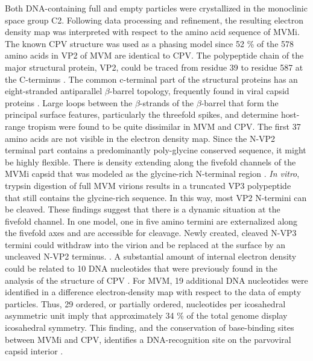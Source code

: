 Both DNA-containing full and empty particles were crystallized in the monoclinic space group C2. Following data processing and refinement, the resulting electron density map was interpreted with respect to the amino acid sequence of MVMi. The known CPV structure was used as a phasing model since 52 \% of the 578 amino acids in VP2 of MVM are identical to CPV. The polypeptide chain of the major structural protein, VP2, could be traced from residue 39 to residue 587 at the C-terminus \cite{pmid15299974}.     
The common c-terminal part of the structural proteins has an eight-stranded antiparallel $\beta$-barrel topology, frequently found in viral capsid proteins \cite{pmid2673017}. Large loops between the $\beta$-strands of the $\beta$-barrel that form the principal surface features, particularly the threefold spikes, and determine host-range tropism were found to be quite dissimilar in MVM and CPV. 
The first 37 amino acids are not visible in the electron density map. Since the N-VP2 terminal part contains a predominantly poly-glycine conserved sequence, it might be highly flexible. There is density extending along the fivefold channels of the MVMi capsid that was modeled as the glycine-rich N-terminal region \cite{pmid15299494, pmid8969301}. \textit{In vitro}, trypsin digestion of full MVM virions results in a truncated VP3 polypeptide that still contains the glycine-rich sequence. In this way, most VP2 N-termini can be cleaved. These findings suggest that there is a dynamic situation at the fivefold channel. In one model, one in five amino termini are externalized along the fivefold axes and are accessible for cleavage. Newly created, cleaved N-VP3 termini could withdraw into the virion and be replaced at the surface by an uncleaved N-VP2 terminus. \cite{pmid8503170, pmid9817841}.
A substantial amount of internal electron density could be related to 10 DNA nucleotides that were previously found in the analysis of the structure of CPV \cite{pmid7735832, pmid1616694}. For MVM, 19 additional DNA nucleotides were identified in a difference electron-density map with respect to the data of empty particles. Thus, 29 ordered, or partially ordered, nucleotides per icosahedral asymmetric unit imply that approximately 34 \% of the total genome display icosahedral symmetry. This finding, and the conservation of base-binding sites between MVMi and CPV, identifies a DNA-recognition site on the parvoviral capsid interior \cite{pmid9817841}.    










